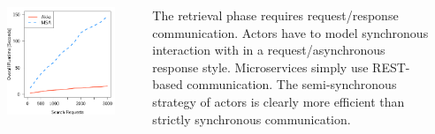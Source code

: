 \documentclass[final,hyperref={pdfpagelabels=true}]{beamer}
\begin{document}
\begin{frame}
\begin{columns}[t]
\begin{column}{.46\textwidth}
      \begin{columns}[t]
        \begin{column}{.4\textwidth}
          \includegraphics[width=1\textwidth]{graphics/eval-search-rtt-overall.pdf}
        \end{column}
        \begin{column}{.05\textwidth}
        \end{column}
        \begin{column}{.55\textwidth}
          {\lmodern

            The retrieval phase requires request/response communication. Actors have to model synchronous interaction with in a request/asynchronous response style. Microservices simply use REST-based communication. The semi-synchronous strategy of actors is clearly more efficient than strictly synchronous communication.  
          }
        \end{column}
      \end{columns}
    \end{column}
    \begin{column}{.02\textwidth}
      \end{column}
  \end{columns}

\end{frame}
\end{document}

